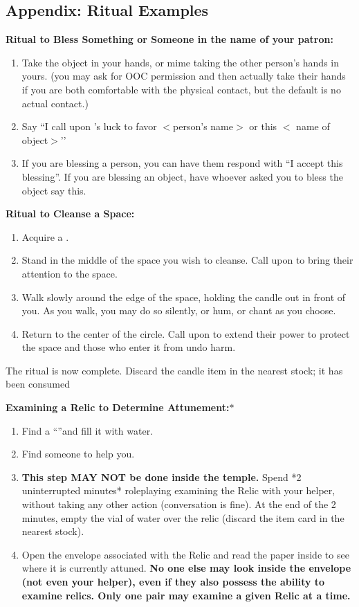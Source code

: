 \documentclass[green]{GL2020}
\begin{document}
\subsection*{Appendix: Ritual Examples}

\textbf{Ritual to Bless Something or Someone in the name of your patron:}
  \begin{enumerate}
    \item Take the object in your hands, or mime taking the other person’s hands in yours. (you may ask for OOC permission and then actually take their hands if you are both comfortable with the physical contact, but the default is no actual contact.)
    \item Say ``I call upon \cGenesis{}’s luck to favor $<$person’s name$>$ or this $<$ name of object$>$’’
    \item If you are blessing a person, you can have them respond with ``I accept this blessing''. If you are blessing an object, have whoever asked you to bless the object say this.
  \end{enumerate}

\textbf{Ritual to Cleanse a Space:}
  \begin{enumerate}
    \item Acquire a \iRitualCandle{}.
    \item Stand in the middle of the space you wish to cleanse. Call upon \cGenesis{} to bring their attention to the space.
    \item Walk slowly around the edge of the space, holding the candle out in front of you. As you walk, you may do so silently, or hum, or chant as you choose.
    \item Return to the center of the circle. Call upon \cGenesis{} to extend their power to protect the space and those who enter it from undo harm.
  \end{enumerate}
The ritual is now complete. Discard the candle item in the nearest stock; it has been consumed
   
\textbf{Examining a Relic to Determine Attunement:}$*$
  \begin{enumerate}
    \item Find a ``\iGlassVial{}''and fill it with water.
		\item Find someone to help you.
    \item \textbf{This step MAY NOT be done inside the temple.} Spend *2 uninterrupted minutes* roleplaying examining the Relic with your helper, without taking any other action (conversation is fine). At the end of the 2 minutes, empty the vial of water over the relic (discard the item card in the nearest stock). 
    \item Open the envelope associated with the Relic and read the paper inside to see where it is currently attuned. \textbf{No one else may look inside the envelope (not even your helper), even if they also possess the ability to examine relics. Only one pair may examine a given Relic at a time.}
  \end{enumerate}
   
\end{document}
